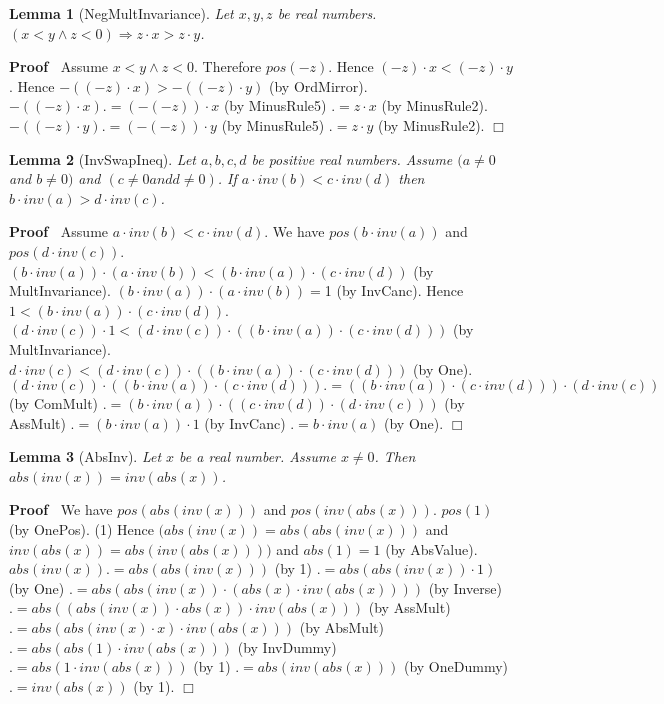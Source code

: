 \documentclass{article}
\newenvironment{forthel}{\begin{leftbar}}{\end{leftbar}}
\newenvironment{proof}{\noindent\textbf{Proof\ }}{\hspace*{\fill}$\Box$\medskip}
\newtheorem{lemma}{Lemma}
\begin{document}
\begin{forthel}
	
	\begin{lemma}[NegMultInvariance]
	Let $x, y, z$ be real numbers.
	$(x < y \wedge z < 0) \Rightarrow z \cdot x > z \cdot y$.
	\end{lemma}
	\begin{proof}
	Assume $x < y \wedge z < 0$.
	Therefore $pos(-z)$.    
	Hence $(-z) \cdot x < (-z) \cdot y$.
	Hence $-((-z) \cdot x) > -((-z) \cdot y)$ (by OrdMirror).
	$-((-z) \cdot x) .= (-(-z)) \cdot x$ (by MinusRule5)
	$.= z \cdot x$ (by MinusRule2).
	$-((-z) \cdot y) .= (-(-z)) \cdot y$ (by MinusRule5)
	$.= z \cdot y$ (by MinusRule2).
	\end{proof}
	
	
	\begin{lemma}[InvSwapIneq]
	Let $a, b, c, d$ be positive real numbers. Assume $(a \neq 0$ and $b \neq 0)$ and $(c \neq 0 and d \neq 0)$. 
	If $a \cdot inv(b) < c \cdot inv(d)$ then $b \cdot inv(a) > d \cdot inv(c)$.
	\end{lemma}
	\begin{proof}
	Assume $a \cdot inv(b) < c \cdot inv(d)$.
	We have $pos(b \cdot inv(a))$ and $pos(d \cdot inv(c))$.
	$(b \cdot inv(a)) \cdot (a \cdot inv(b)) < (b \cdot inv(a)) \cdot (c \cdot inv(d))$ (by MultInvariance).
	$(b \cdot inv(a)) \cdot (a \cdot inv(b)) = $1 (by InvCanc).
	Hence $1 < (b \cdot inv(a)) \cdot (c \cdot inv(d))$.
	$(d \cdot inv(c)) \cdot 1 < (d \cdot inv(c)) \cdot ((b \cdot inv(a)) \cdot (c \cdot inv(d)))$ (by MultInvariance).
	$d \cdot inv(c) < (d \cdot inv(c)) \cdot ((b \cdot inv(a)) \cdot (c \cdot inv(d)))$ (by One).
	$(d \cdot inv(c)) \cdot ((b \cdot inv(a)) \cdot (c \cdot inv(d))) .= ((b \cdot inv(a)) \cdot (c \cdot inv(d))) \cdot (d \cdot inv(c))$ (by ComMult)
	$.= (b \cdot inv(a)) \cdot ((c \cdot inv(d)) \cdot (d \cdot inv(c)))$ (by AssMult)
	$.= (b \cdot inv(a)) \cdot 1$ (by InvCanc)
	$.= b \cdot inv(a)$ (by One).   
	\end{proof}
	
	
	
	\begin{lemma}[AbsInv]
	Let $x$ be a real number. Assume $x \neq 0$. Then $abs(inv(x)) = inv(abs(x))$.
	\end{lemma}
	\begin{proof}
	We have $pos(abs(inv(x)))$ and $pos(inv(abs(x)))$.
	$pos(1)$ (by OnePos).
	(1) Hence $( abs(inv(x)) = abs(abs(inv(x)))$ and $inv(abs(x)) = abs(inv(abs(x))) )$ and $abs(1) = 1$ (by AbsValue).
	$abs(inv(x)) .= abs(abs(inv(x)))$ (by 1)
	$.= abs(abs(inv(x)) \cdot 1)$ (by One)
	$.= abs(abs(inv(x)) \cdot (abs(x) \cdot inv(abs(x))))$ (by Inverse)
	$.= abs((abs(inv(x)) \cdot abs(x)) \cdot inv(abs(x)))$ (by AssMult)
	$.= abs(abs(inv(x) \cdot x) \cdot inv(abs(x)))$ (by AbsMult)
	$.= abs(abs(1) \cdot inv(abs(x)))$ (by InvDummy)
	$.= abs(1 \cdot inv(abs(x)))$ (by 1) 
	$.= abs(inv(abs(x)))$ (by OneDummy)
	$.= inv(abs(x))$ (by 1).    
	\end{proof}
	

\end{forthel}
\end{document}
